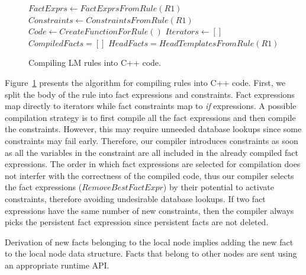 \begin{figure}
\begin{algorithm}[H]
 $FactExprs \longleftarrow FactExprsFromRule(R1)$\;
 $Constraints \longleftarrow ConstraintsFromRule(R1)$\;
 $Code \longleftarrow CreateFunctionForRule()$\;
 $Iterators \longleftarrow []$\;
 $CompiledFacts = []$\;
 $HeadFacts = HeadTemplatesFromRule(R1)$\;
\end{algorithm}
 \caption{Compiling LM rules into C++ code.}
 \label{alg:compile_rule}
\end{figure}

Figure~\ref{alg:compile_rule} presents the algorithm for compiling rules into
C++ code. First, we split the body of the rule into fact expressions and
constraints. Fact expressions map directly to iterators while fact constraints
map to \emph{if} expressions. A possible compilation strategy is to first
compile all the fact expressions and then compile the constraints. However, this
may require unneeded database lookups since some constraints may fail early.
Therefore, our compiler introduces constraints as soon as all the variables in
the constraint are all included in the already compiled fact expressions. The
order in which fact expressions are selected for compilation does not interfer
with the correctness of the compiled code, thus our compiler selects the fact
expressions ($RemoveBestFactExpr$) by their potential to activate constraints,
therefore avoiding undesirable database lookups. If two fact expressions have
the same number of new constraints, then the compiler always picks the
persistent fact expression since persistent facts are not deleted.

Derivation of new facts belonging to the local node implies adding the new fact
to the local node data structure. Facts that belong to other nodes are sent
using an appropriate runtime API.


